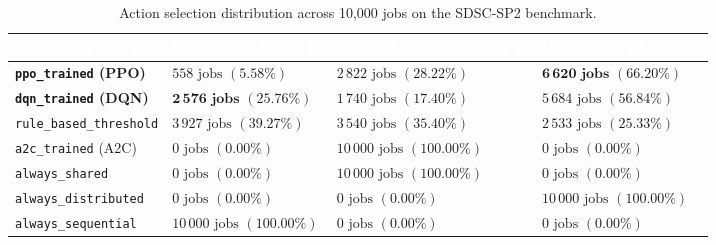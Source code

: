 \documentclass[11pt,a4paper]{article}
\begin{document}
\begin{table}[tbp]
\centering
\footnotesize
\renewcommand{\arraystretch}{1.3}
\begin{tabularx}{\textwidth}{p{3.6cm} >{\centering\arraybackslash}X >{\centering\arraybackslash}X >{\centering\arraybackslash}X}
\toprule
\rowcolor{tableheader}
\textcolor{white}{\textbf{Scheduling Policy}} & \textcolor{white}{\textbf{Sequential (Action 0)}} & \textcolor{white}{\textbf{Shared-Memory (Action 1)}} & \textcolor{white}{\textbf{Distributed (Action 2)}} \\
\midrule
\rowcolor{highlightgreen}
\textbf{\texttt{ppo\_trained} (PPO)} & $558\text{ jobs } (5.58\%)$ & $2\,822\text{ jobs } (28.22\%)$ & $\mathbf{6\,620\text{ jobs } (66.20\%)}$ \\
\rowcolor{highlightgreen}
\textbf{\texttt{dqn\_trained} (DQN)} & $\mathbf{2\,576\text{ jobs } (25.76\%)}$ & $1\,740\text{ jobs } (17.40\%)$ & $5\,684\text{ jobs } (56.84\%)$ \\
\texttt{rule\_based\_threshold} & $3\,927\text{ jobs } (39.27\%)$ & $3\,540\text{ jobs } (35.40\%)$ & $2\,533\text{ jobs } (25.33\%)$ \\
\texttt{a2c\_trained} (A2C) & $0\text{ jobs } (0.00\%)$ & $10\,000\text{ jobs } (100.00\%)$ & $0\text{ jobs } (0.00\%)$ \\
\texttt{always\_shared} & $0\text{ jobs } (0.00\%)$ & $10\,000\text{ jobs } (100.00\%)$ & $0\text{ jobs } (0.00\%)$ \\
\texttt{always\_distributed} & $0\text{ jobs } (0.00\%)$ & $0\text{ jobs } (0.00\%)$ & $10\,000\text{ jobs } (100.00\%)$ \\
\texttt{always\_sequential} & $10\,000\text{ jobs } (100.00\%)$ & $0\text{ jobs } (0.00\%)$ & $0\text{ jobs } (0.00\%)$ \\
\bottomrule
\end{tabularx}
\caption{Action selection distribution across 10,000 jobs on the SDSC-SP2 benchmark.}
\label{tab:action_breakdown}
\end{table}
\end{document}
